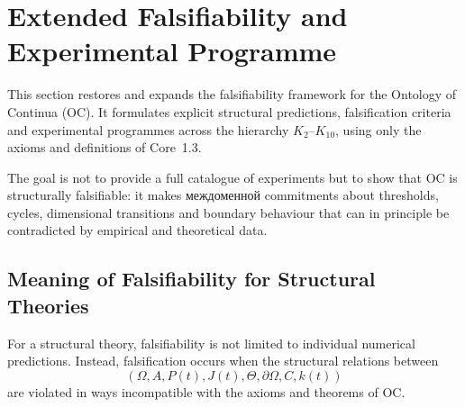 
\section{Extended Falsifiability and Experimental Programme}
\label{sec:falsifiability-extended}

This section restores and expands the falsifiability framework for the
Ontology of Continua (OC).  It formulates explicit structural predictions,
falsification criteria and experimental programmes across the hierarchy
\(K_2\)–\(K_{10}\), using only the axioms and definitions of Core~1.3.

The goal is not to provide a full catalogue of experiments but to show that
OC is structurally falsifiable: it makes междоменной commitments about
thresholds, cycles, dimensional transitions and boundary behaviour that can
in principle be contradicted by empirical and theoretical data.

\subsection{Meaning of Falsifiability for Structural Theories}

For a structural theory, falsifiability is not limited to individual
numerical predictions.  Instead, falsification occurs when the structural
relations between
\[
  (\Omega, A, P(t), J(t),
   \Theta, \partial\Omega, C, k(t))
\]
are violated in ways incompatible with the axioms and theorems of OC.

